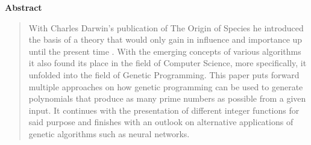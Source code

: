 \documentclass[11pt,a4paper]{article}
\renewenvironment{abstract}
   {
\centerline{\large\bf Abstract}
    \vspace{-0.1in}\begin{quote}}
       {\par\end{quote}\vskip 0.1in}
\begin{document}

\begin{abstract} 
\small
With Charles Darwin's publication of The Origin of Species he introduced the basis of a theory that would only gain in influence and importance up until the present time \citep{Darwin}. With the emerging concepts of various algorithms it also found its place in the field of Computer Science, more specifically, it unfolded into the field of Genetic Programming.
This paper puts forward multiple approaches on how genetic programming can be used to generate polynomials that produce as many prime numbers as possible from a given input.
It continues with the presentation of different integer functions for said purpose and finishes with an outlook on alternative applications of genetic algorithms such as neural networks. 
\end{abstract} 
\end{document}
